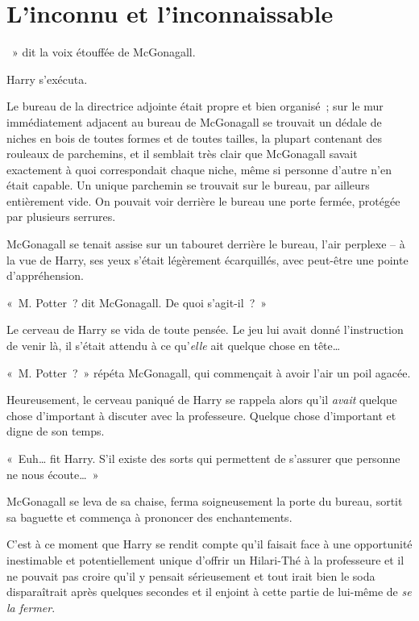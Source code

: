
\chapter{L'inconnu et l'inconnaissable}

~» dit la voix étouffée de McGonagall.

\hplettrineextrapara
Harry s'exécuta.

Le bureau de la directrice adjointe était propre et bien organisé~; sur le mur immédiatement adjacent au bureau de McGonagall se trouvait un dédale de niches en bois de toutes formes et de toutes tailles, la plupart contenant des rouleaux de parchemins, et il semblait très clair que McGonagall savait exactement à quoi correspondait chaque niche, même si personne d'autre n'en était capable.
Un unique parchemin se trouvait sur le bureau, par ailleurs entièrement vide.
On pouvait voir derrière le bureau une porte fermée, protégée par plusieurs serrures.

McGonagall se tenait assise sur un tabouret derrière le bureau, l'air perplexe -- à la vue de Harry, ses yeux s'était légèrement écarquillés, avec peut-être une pointe d'appréhension.

«~M. Potter~? dit McGonagall. De quoi s'agit-il~?~»

Le cerveau de Harry se vida de toute pensée.
Le jeu lui avait donné l'instruction de venir là, il s'était attendu à ce qu'\emph{elle} ait quelque chose en tête…

«~M. Potter~?~» répéta McGonagall, qui commençait à avoir l'air un poil agacée.

Heureusement, le cerveau paniqué de Harry se rappela alors qu'il \emph{avait} quelque chose d'important à discuter avec la professeure.
Quelque chose d'important et digne de son temps.

«~Euh… fit Harry. S'il existe des sorts qui permettent de s'assurer que personne ne nous écoute…~»

McGonagall se leva de sa chaise, ferma soigneusement la porte du bureau, sortit sa baguette et commença à prononcer des enchantements.

C'est à ce moment que Harry se rendit compte qu'il faisait face à une opportunité inestimable et potentiellement unique d'offrir un Hilari-Thé à la professeure et il ne pouvait pas croire qu'il y pensait sérieusement et tout irait bien le soda disparaîtrait après quelques secondes et il enjoint à cette partie de lui-même de \emph{se la fermer}.

